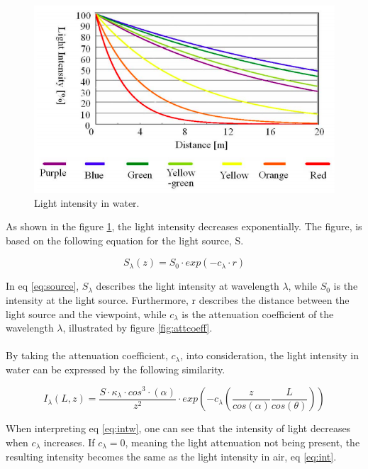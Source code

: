 \begin{figure}[H]
\centering
  \includegraphics[width=12cm]{Images/theory/intensity.png}
  \caption{Light intensity in water.}
  \label{fig:lightinwater}
\end{figure}

As shown in the figure \ref{fig:lightinwater}, the light intensity decreases exponentially. The figure, is based on the following equation for the light source, S. 

\begin{equation} \label{eq:source}
S_{\lambda} (z) = S_0 \cdot exp (-c_{\lambda} \cdot r)
\end{equation}

In eq \ref{eq:source}, $S_{\lambda}$ describes the light intensity at wavelength $\lambda$, while $S_0$ is the intensity at the light source. Furthermore, r describes the distance between the light source and the viewpoint, while $c_{\lambda}$ is the attenuation coefficient of the wavelength $\lambda$, illustrated by figure \ref{fig:attcoeff}.
\\\\
By taking the attenuation coefficient, $c_{\lambda}$, into consideration, the light intensity in water can be expressed by the following similarity. 

\begin{equation} \label{eq:intw}
    I_ {\lambda} (L, z) = \frac{S \cdot \kappa_{\lambda}\cdot cos^{3}\cdot (\alpha)}{z^2} \cdot exp \left(-c_{\lambda}\left(\frac{z}{cos(\alpha)}\frac{L}{cos(\theta)}\right)\right)
\end{equation}

When interpreting eq \ref{eq:intw}, one can see that the intensity of light decreases when $c_{\lambda}$ increases. If $c_{\lambda} = 0$, meaning the light attenuation not being present, the resulting intensity becomes the same as the light intensity in air, eq \ref{eq:int}. 

